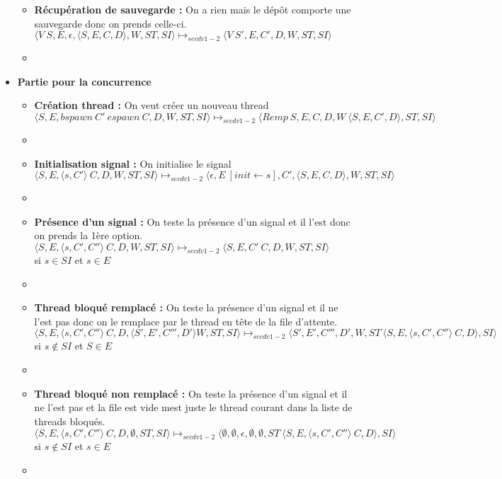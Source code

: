 \documentclass[10pt,a4paper]{article}
\begin{document}
\begin{itemize}
\begin{itemize}
						\item[] \textbf{Récupération de sauvegarde :} On a rien mais le dépôt comporte une sauvegarde donc on prends celle-ci.
						\smallbreak
						$\langle V~S,E,\epsilon,\langle S,E,C,D\rangle,W,ST,SI\rangle 
						\longmapsto_{secdv1-2} 
						\langle V~S',E,C',D,W,ST,SI\rangle$
						\item[]
						
					\end{itemize}
					\item[] \textbf{Partie pour la concurrence}
					\begin{itemize}
						\item[] \textbf{Création thread :} On veut créer un nouveau thread
						\smallbreak
						$\langle S,E,bspawn~C'~espawn~C,D,W,ST,SI\rangle 
						\longmapsto_{secdv1-2} 
						\langle Remp~S,E,C,D,W~\langle S,E,C',D\rangle,ST,SI\rangle$
						\item[]
						
						
						\item[] \textbf{Initialisation signal :} On initialise le signal 
						\smallbreak 
						$\langle S,E,\langle s, C'\rangle~C,D,W,ST,SI\rangle 
						\longmapsto_{secdv1-2} 
						\langle\epsilon,E~[init \leftarrow s],C',\langle S,E,C,D\rangle,W,ST,SI\rangle$
						\item[] 
						
						\item[] \textbf{Présence d'un signal :} On teste la présence d'un signal et il l'est donc on prends la 1ère option. 
						\smallbreak
						$\langle S,E,\langle s, C',C''\rangle~C,D,W,ST,SI\rangle 
						\longmapsto_{secdv1-2} 
						\langle S,E,C'~C,D,W,ST,SI\rangle$ 
						\\si $s \in SI$ et $s \in E$ 
						\item[]
						
						\item[] \textbf{Thread bloqué remplacé :} On teste la présence d'un signal et il ne l'est pas donc on le remplace par le thread en tête de la file d'attente.
						\smallbreak 
						$\langle S,E,\langle s, C',C''\rangle~C,D,\langle S',E',C''',D'\rangle W,ST,SI\rangle 
						\longmapsto_{secdv1-2} 
						\langle S',E',C''',D',W,ST~\langle S,E,\langle s, C',C''\rangle~C,D\rangle,SI\rangle$ 
						\\si $s \notin SI$ et $S \in E$ 
						\item[]
						
						\item[] \textbf{Thread bloqué non remplacé :} On teste la présence d'un signal et il ne l'est pas et la file est vide mest juste le thread courant dans la liste de threads bloqués.
						\smallbreak
						$\langle S,E,\langle s, C',C''\rangle~C,D,\emptyset,ST,SI\rangle 
						\longmapsto_{secdv1-2} 
						\langle\emptyset,\emptyset,\epsilon,\emptyset,\emptyset,ST~\langle S,E,\langle s, C',C''\rangle~C,D\rangle,SI\rangle$ 
						\\si $s \notin SI$ et $s \in E$ 
						\item[]
						

\end{itemize}
\end{itemize}
\end{document}
